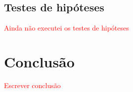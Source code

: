 \documentclass[conference]{IEEEtran}
\begin{document}
\subsection{Testes de hipóteses}

\textcolor{red}{Ainda não executei os testes de hipóteses}

\section{Conclusão}
\label{sec:conclusao}

\textcolor{red}{Escrever conclusão}




% 

\end{document}
